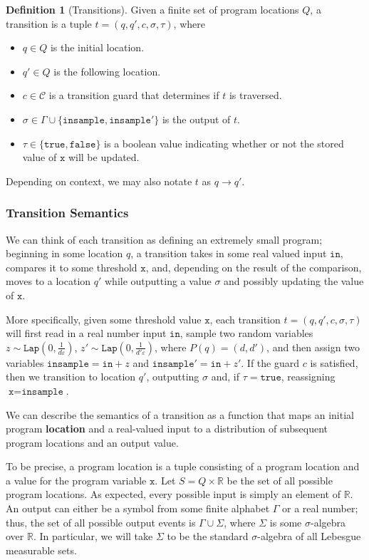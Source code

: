 \documentclass[12pt]{article}
\newcommand{\RR}{\mathbb{R}}
\newcommand{\Lap}{\texttt{Lap}}
\theoremstyle{definition}
\newtheorem{defn}[thm]{Definition}
\begin{document}
\begin{defn}[Transitions]
    Given a finite set of program locations $Q$, a transition is a tuple $t = (q, q', c, \sigma, \tau)$, where \begin{itemize}
        \item $q\in Q$ is the initial location.
        \item $q'\in Q$ is the following location.
        \item $c\in \mathcal{C}$ is a transition guard that determines if $t$ is traversed.
        \item $\sigma \in \Gamma\cup\{\texttt{insample}, \texttt{insample}'\}$ is the output of $t$.
        \item $\tau\in\{\texttt{true}, \texttt{false}\}$ is a boolean value indicating whether or not the stored value of $\texttt{x}$ will be updated.
    \end{itemize}
    Depending on context, we may also notate $t$ as $q\to q'$. 
\end{defn}

\subsubsection{Transition Semantics}

We can think of each transition as defining an extremely small program; beginning in some location $q$, a transition takes in some real valued input $\texttt{in}$, compares it to some threshold $\texttt{x}$, and, depending on the result of the comparison, moves to a location $q'$ while outputting a value $\sigma$ and possibly updating the value of $\texttt{x}$.

More specifically, given some threshold value $\texttt{x}$, each transition $t = (q, q', c, \sigma, \tau)$ will first read in a real number input $\texttt{in}$, sample two random variables $z\sim\Lap(0, \frac{1}{d\varepsilon})$, $z'\sim\Lap(0, \frac{1}{d'\varepsilon})$, where $P(q) = (d, d')$, and then assign two variables $\texttt{insample} = \texttt{in} + z$ and $\texttt{insample}' = \texttt{in} + z'$. 
If the guard $c$ is satisfied, then we transition to location $q'$, outputting $\sigma$ and, if $\tau = \texttt{true}$, reassigning $\texttt{x} = \texttt{insample}$. 

We can describe the semantics of a transition as a function that maps an initial program \textbf{location} and a real-valued input to a distribution of subsequent program locations and an output value. 

To be precise, a program location is a tuple consisting of a program location and a value for the program variable $\texttt{x}$. Let $S = Q\times\RR$ be the set of all possible program locations. As expected, every possible input is simply an element of $\RR$. 
An output can either be a symbol from some finite alphabet $\Gamma$ or a real number; thus, the set of all possible output events is $\Gamma \cup \Sigma$, where $\Sigma$ is some $\sigma$-algebra over $\RR$.
In particular, we will take $\Sigma$ to be the standard $\sigma$-algebra of all Lebesgue measurable sets. 
\end{document}
